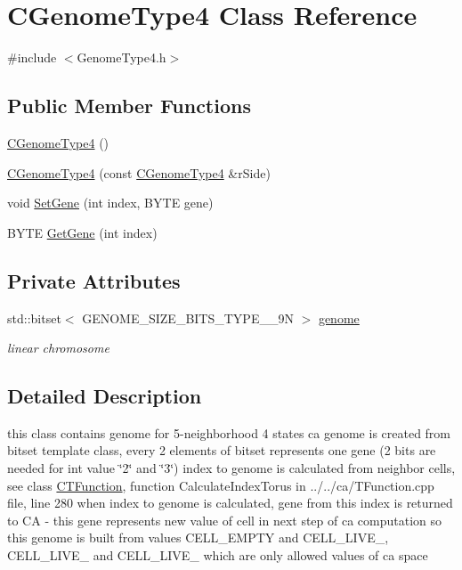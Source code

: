 \hypertarget{classCGenomeType4}{
\section{CGenomeType4 Class Reference}
\label{classCGenomeType4}
}


{\ttfamily \#include $<$GenomeType4.h$>$}\subsection*{Public Member Functions}
\begin{DoxyCompactItemize}
\item 
\hyperlink{classCGenomeType4_a48a81653decfdcd49be75fcefb8b9631}{CGenomeType4} ()
\item 
\hyperlink{classCGenomeType4_ace78f82cd5544971117f518012f34901}{CGenomeType4} (const \hyperlink{classCGenomeType4}{CGenomeType4} \&rSide)
\item 
void \hyperlink{classCGenomeType4_a1add0c5bed39e85a32e3a00ea2809032}{SetGene} (int index, BYTE gene)
\item 
BYTE \hyperlink{classCGenomeType4_a8d55be3eefbd0e6451d385b231c8c96a}{GetGene} (int index)
\end{DoxyCompactItemize}
\subsection*{Private Attributes}
\begin{DoxyCompactItemize}
\item 
\hypertarget{classCGenomeType4_afd4f07598a9a035fa1aa11716c66329a}{
std::bitset$<$ GENOME\_\-SIZE\_\-BITS\_\-TYPE\_\_\-9N $>$ \hyperlink{classCGenomeType4_afd4f07598a9a035fa1aa11716c66329a}{genome}}
\label{classCGenomeType4_afd4f07598a9a035fa1aa11716c66329a}

\begin{DoxyCompactList}\small\item\em linear chromosome \item\end{DoxyCompactList}\end{DoxyCompactItemize}


\subsection{Detailed Description}
this class contains genome for 5-\/neighborhood 4 states ca genome is created from bitset template class, every 2 elements of bitset represents one gene (2 bits are needed for int value \char`\"{}2\char`\"{} and \char`\"{}3\char`\"{}) index to genome is calculated from neighbor cells, see class \hyperlink{classCTFunction}{CTFunction}, function CalculateIndexTorus in ../../ca/TFunction.cpp file, line 280 when index to genome is calculated, gene from this index is returned to CA -\/ this gene represents new value of cell in next step of ca computation so this genome is built from values CELL\_\-EMPTY and CELL\_\-LIVE\_, CELL\_\-LIVE\_ and CELL\_\-LIVE\_ which are only allowed values of ca space 

